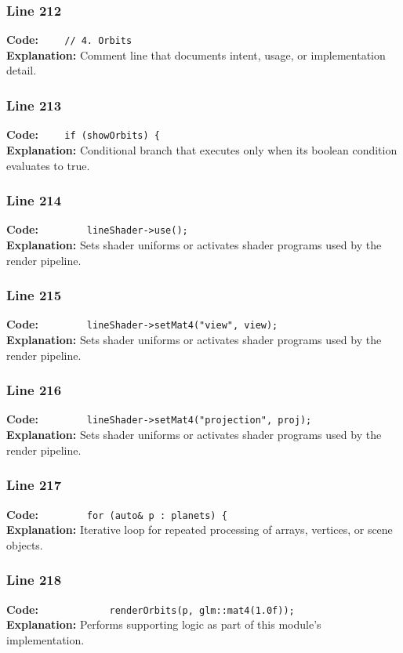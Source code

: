 \documentclass[11pt,a4paper]{article}
\begin{document}
\subsubsection*{Line 212}
\textbf{Code:} \verb|    // 4. Orbits|\\
\textbf{Explanation:} Comment line that documents intent, usage, or implementation detail.

\subsubsection*{Line 213}
\textbf{Code:} \verb|    if (showOrbits) {|\\
\textbf{Explanation:} Conditional branch that executes only when its boolean condition evaluates to true.

\subsubsection*{Line 214}
\textbf{Code:} \verb|        lineShader->use();|\\
\textbf{Explanation:} Sets shader uniforms or activates shader programs used by the render pipeline.

\subsubsection*{Line 215}
\textbf{Code:} \verb|        lineShader->setMat4("view", view);|\\
\textbf{Explanation:} Sets shader uniforms or activates shader programs used by the render pipeline.

\subsubsection*{Line 216}
\textbf{Code:} \verb|        lineShader->setMat4("projection", proj);|\\
\textbf{Explanation:} Sets shader uniforms or activates shader programs used by the render pipeline.

\subsubsection*{Line 217}
\textbf{Code:} \verb|        for (auto& p : planets) {|\\
\textbf{Explanation:} Iterative loop for repeated processing of arrays, vertices, or scene objects.

\subsubsection*{Line 218}
\textbf{Code:} \verb|            renderOrbits(p, glm::mat4(1.0f));|\\
\textbf{Explanation:} Performs supporting logic as part of this module's implementation.
\end{document}
